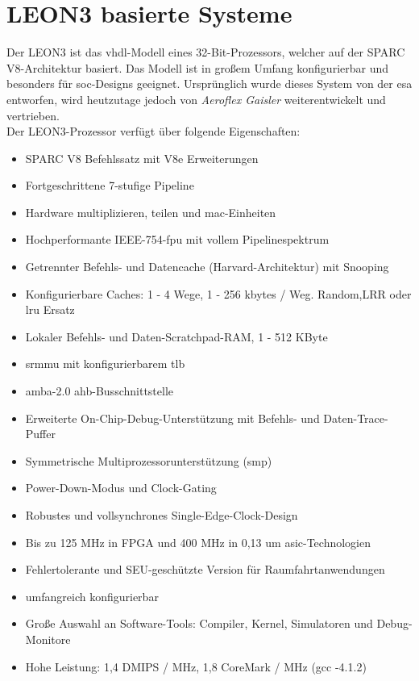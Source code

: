 \section{LEON3 basierte Systeme}\label{kap:leon3}

Der LEON3 ist das \ac{vhdl}-Modell eines 32-Bit-Prozessors, welcher auf der SPARC V8-Architektur basiert. Das Modell ist in großem Umfang konfigurierbar und besonders für \ac{soc}-Designs geeignet.
Ursprünglich wurde dieses System von der \ac{esa} entworfen, wird heutzutage jedoch von \emph{Aeroflex Gaisler} weiterentwickelt und vertrieben.\\
Der LEON3-Prozessor verfügt über folgende Eigenschaften:\cite{leon}\\

\begin{itemize}
  \item SPARC V8 Befehlssatz mit V8e Erweiterungen
\item Fortgeschrittene 7-stufige Pipeline
\item Hardware multiplizieren, teilen und \ac{mac}-Einheiten
\item Hochperformante IEEE-754-\ac{fpu} mit vollem Pipelinespektrum
\item Getrennter Befehls- und Datencache (Harvard-Architektur) mit Snooping
\item Konfigurierbare Caches: 1 - 4 Wege, 1 - 256 kbytes / Weg. Random,LRR oder \ac{lru} Ersatz
\item Lokaler Befehls- und Daten-Scratchpad-RAM, 1 - 512 KByte
\item \ac{srmmu} mit konfigurierbarem \ac{tlb}
\item \ac{amba}-2.0 \ac{ahb}-Busschnittstelle
\item Erweiterte On-Chip-Debug-Unterstützung mit Befehls- und Daten-Trace-Puffer
\item Symmetrische Multiprozessorunterstützung (\ac{smp})
\item Power-Down-Modus und Clock-Gating
\item Robustes und vollsynchrones Single-Edge-Clock-Design
\item Bis zu 125 MHz in FPGA und 400 MHz in 0,13 um \ac{asic}-Technologien
\item Fehlertolerante und SEU-geschützte Version für Raumfahrtanwendungen
\item umfangreich konfigurierbar
\item Große Auswahl an Software-Tools: Compiler, Kernel, Simulatoren und Debug-Monitore
\item Hohe Leistung: 1,4 DMIPS / MHz, 1,8 CoreMark / MHz (gcc -4.1.2)
\end{itemize}


